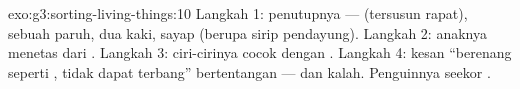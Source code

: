 \begin{solution}{exo:g3:sorting-living-things:10}
Langkah 1: penutupnya ---  (tersusun rapat), sebuah paruh,
dua kaki, sayap (berupa sirip pendayung). Langkah 2: anaknya menetas
dari . Langkah 3: ciri-cirinya cocok dengan . Langkah 4:
kesan ``berenang seperti , tidak dapat terbang'' bertentangan ---
dan kalah. Penguinnya seekor .
\end{solution}
